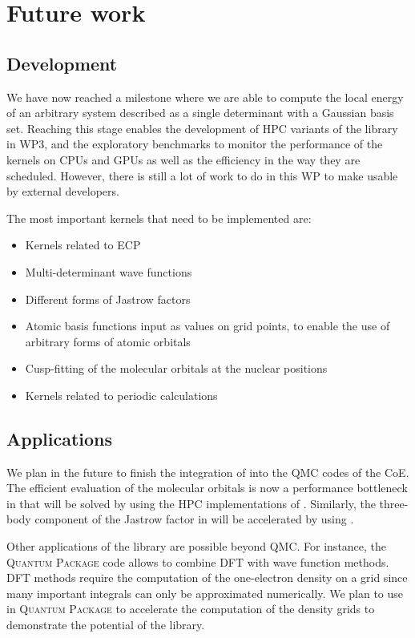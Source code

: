 \section{Future work}

\subsection{Development}

We have now reached a milestone where we are able to compute the local energy of an
arbitrary system described as a single determinant with a Gaussian basis set.
Reaching this stage enables the development of \ac{HPC} variants of the library in
\ac{WP}3, and the exploratory benchmarks to monitor the performance of the kernels on
CPUs and \acp{GPU} as well as the efficiency in the way they are scheduled.
However, there is still a lot of work to do in this \ac{WP} to make \QMCkl{}
usable by external developers.

The most important kernels that need to be implemented are:
\begin{itemize}
  \item Kernels related to \ac{ECP}
  \item Multi-determinant wave functions
  \item Different forms of Jastrow factors
  \item Atomic basis functions input as values on grid points, to enable the use of
        arbitrary forms of atomic orbitals
  \item Cusp-fitting of the molecular orbitals at the nuclear positions
  \item Kernels related to periodic calculations
\end{itemize}

\subsection{Applications}

\newcommand{\qp}{\textsc{Quantum Package}}

We plan in the future to finish the integration of \QMCkl{} into the \ac{QMC}
codes of the \ac{CoE}. The efficient evaluation of the molecular orbitals is
now a performance bottleneck in \turbo{} that will be solved by using the
\ac{HPC} implementations of \QMCkl{}. Similarly, the three-body component of
the Jastrow factor in \champ{} will be accelerated by using \QMCkl{}.

Other applications of the library are possible beyond \ac{QMC}. For instance, 
the \qp{} code allows to combine \ac{DFT} with wave function
methods. \ac{DFT} methods require the computation of the one-electron density on 
a grid since many important integrals can only be approximated numerically. We
plan to use \QMCkl{} in \qp{} to accelerate the computation of the density grids
to demonstrate the potential of the library.



\clearpage


